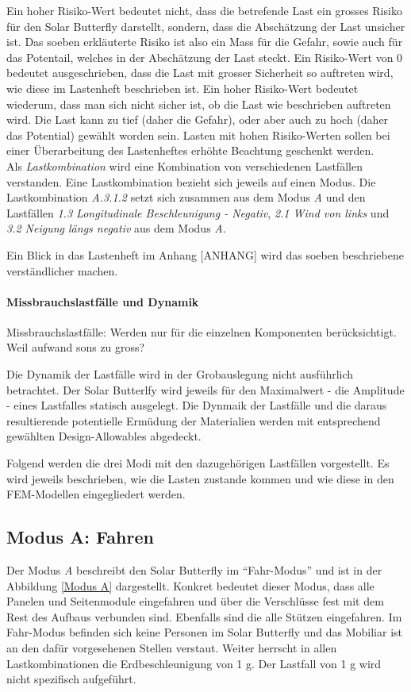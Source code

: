 Ein hoher Risiko-Wert bedeutet nicht, dass die betrefende Last ein grosses Risiko für den Solar Butterfly darstellt, sondern, dass die Abschätzung der Last unsicher ist. Das soeben erkläuterte Risiko ist also ein Mass für die Gefahr, sowie auch für das Potentail, welches in der Abschätzung der Last steckt. Ein Risiko-Wert von 0 bedeutet ausgeschrieben, dass die Last mit grosser Sicherheit so auftreten wird, wie diese im Lastenheft beschrieben ist. Ein hoher Risiko-Wert bedeutet wiederum, dass man sich nicht sicher ist, ob die Last wie beschrieben auftreten wird. Die Last kann zu tief (daher die Gefahr), oder aber auch zu hoch (daher das Potential) gewählt worden sein. Lasten mit hohen Risiko-Werten sollen bei einer Überarbeitung des Lastenheftes erhöhte Beachtung geschenkt werden.\\
Als \emph{Lastkombination} wird eine Kombination von verschiedenen Lastfällen verstanden. Eine Lastkombination bezieht sich jeweils auf einen Modus. Die Lastkombination \emph{A.3.1.2} setzt sich zusammen aus dem Modus \emph{A} und den Lastfällen \emph{1.3 Longitudinale Beschleunigung - Negativ}, \emph{2.1 Wind von links} und \emph{3.2 Neigung längs negativ} aus dem Modus \emph{A}.

Ein Blick in das Lastenheft im Anhang [ANHANG] wird das soeben beschriebene verständlicher machen.\\

\paragraph{Missbrauchslastfälle und Dynamik}
Missbrauchslastfälle: Werden nur für die einzelnen Komponenten berücksichtigt. Weil aufwand sons zu gross?

Die Dynamik der Lastfälle wird in der Grobauslegung nicht ausführlich betrachtet. Der Solar Butterlfy wird jeweils für den Maximalwert - die Amplitude - eines Lastfalles statisch ausgelegt. Die Dynmaik der Lastfälle und die daraus resultierende potentielle Ermüdung der Materialien werden mit entsprechend gewählten Design-Allowables abgedeckt.

Folgend werden die drei Modi mit den dazugehörigen Lastfällen vorgestellt. Es wird jeweils beschrieben, wie die Lasten zustande kommen und wie diese in den FEM-Modellen eingegliedert werden.

\subsection{Modus A: Fahren}
Der Modus \emph{A} beschreibt den Solar Butterfly im ``Fahr-Modus'' und ist in der Abbildung \ref{Modus A} dargestellt. Konkret bedeutet dieser Modus, dass alle Panelen und Seitenmodule eingefahren und über die Verschlüsse fest mit dem Rest des Aufbaus verbunden sind. Ebenfalls sind die alle Stützen eingefahren. Im Fahr-Modus befinden sich keine Personen im Solar Butterfly und das Mobiliar ist an den dafür vorgesehenen Stellen verstaut. Weiter herrscht in allen Lastkombinationen die Erdbeschleunigung von 1 g. Der Lastfall von 1 g wird nicht spezifisch aufgeführt.

